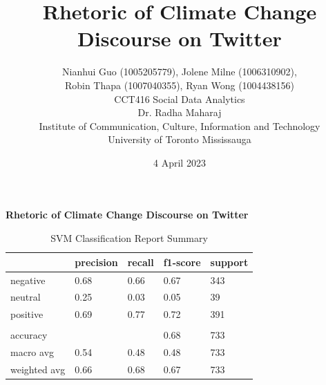\documentclass[12pt,titlepage]{article}
\begin{document}
\begin{titlepage}
\title{Rhetoric of Climate Change Discourse on Twitter}
\author{Nianhui Guo (1005205779), Jolene Milne (1006310902),\\
Robin Thapa (1007040355), Ryan Wong (1004438156)\\
CCT416 Social Data Analytics\\
Dr. Radha Maharaj\\
Institute of Communication, Culture, Information and Technology\\
University of Toronto Mississauga\\}
\date{4 April 2023}
\maketitle
\end{titlepage}

\newpage
\tableofcontents
\setcounter{secnumdepth}{0}

\newpage
\begin{center}
    \textbf{\Large Rhetoric of Climate Change Discourse on Twitter}
\end{center}

\begin{table}[ht!]
\centering
  \begin{tabular}{lllll}
  & precision & recall & f1-score & support \\ \hline
negative     & 0.68      & 0.66   & 0.67     & 343     \\
neutral      & 0.25      & 0.03   & 0.05     & 39      \\
positive     & 0.69      & 0.77   & 0.72     & 391     \\
             &           &        &          &         \\
accuracy     &           &        & 0.68     & 733     \\
macro avg    & 0.54      & 0.48   & 0.48     & 733     \\
weighted avg & 0.66      & 0.68   & 0.67     & 733    
  \end{tabular}
  \caption{SVM Classification Report Summary}
  \label{tab:svm}
\end{table}

\singlespacing
\end{document}
